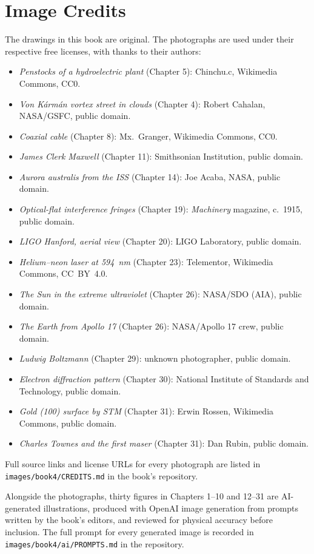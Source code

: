 \chapter*{Image Credits}

The drawings in this book are original. The photographs are used
under their respective free licenses, with thanks to their authors:

\begin{itemize}
  \item \emph{Penstocks of a hydroelectric plant} (Chapter 5): Chinchu.c, Wikimedia Commons, CC0.
  \item \emph{Von K\'arm\'an vortex street in clouds} (Chapter 4): Robert Cahalan, NASA/GSFC, public domain.
  \item \emph{Coaxial cable} (Chapter 8): Mx.~Granger, Wikimedia Commons, CC0.
  \item \emph{James Clerk Maxwell} (Chapter 11): Smithsonian Institution, public domain.
  \item \emph{Aurora australis from the ISS} (Chapter 14): Joe Acaba, NASA, public domain.
  \item \emph{Optical-flat interference fringes} (Chapter 19): \emph{Machinery} magazine, c.~1915, public domain.
  \item \emph{LIGO Hanford, aerial view} (Chapter 20): LIGO Laboratory, public domain.
  \item \emph{Helium--neon laser at 594~nm} (Chapter 23): Telementor, Wikimedia Commons, CC~BY~4.0.
  \item \emph{The Sun in the extreme ultraviolet} (Chapter 26): NASA/SDO (AIA), public domain.
  \item \emph{The Earth from Apollo 17} (Chapter 26): NASA/Apollo 17 crew, public domain.
  \item \emph{Ludwig Boltzmann} (Chapter 29): unknown photographer, public domain.
  \item \emph{Electron diffraction pattern} (Chapter 30): National Institute of Standards and Technology, public domain.
  \item \emph{Gold (100) surface by STM} (Chapter 31): Erwin Rossen, Wikimedia Commons, public domain.
  \item \emph{Charles Townes and the first maser} (Chapter 31): Dan Rubin, public domain.
\end{itemize}

Full source links and license URLs for every photograph are listed
in \texttt{images/book4/CREDITS.md} in the book's repository.

\bigskip
Alongside the photographs, thirty figures in Chapters 1--10 and 12--31
are AI-generated illustrations, produced with OpenAI image generation
from prompts written by the book's editors, and reviewed for physical
accuracy before inclusion. The full prompt for every generated image is
recorded in \texttt{images/book4/ai/PROMPTS.md} in the repository.
\clearpage
